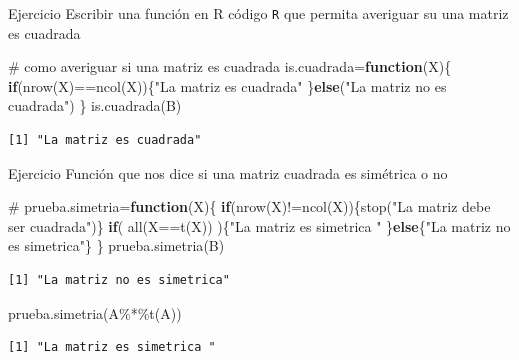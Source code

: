 \documentclass[
  ignorenonframetext,
  aspectratio=169,
  spanish,
]{beamer}
\newenvironment{Shaded}{\begin{snugshade}}{\end{snugshade}}
\newcommand{\CommentTok}[1]{\textcolor[rgb]{0.37,0.37,0.37}{#1}}
\newcommand{\ControlFlowTok}[1]{\textcolor[rgb]{0.00,0.23,0.31}{\textbf{#1}}}
\newcommand{\FunctionTok}[1]{\textcolor[rgb]{0.28,0.35,0.67}{#1}}
\newcommand{\NormalTok}[1]{\textcolor[rgb]{0.00,0.23,0.31}{#1}}
\newcommand{\OtherTok}[1]{\textcolor[rgb]{0.00,0.23,0.31}{#1}}
\newcommand{\SpecialCharTok}[1]{\textcolor[rgb]{0.37,0.37,0.37}{#1}}
\newcommand{\StringTok}[1]{\textcolor[rgb]{0.13,0.47,0.30}{#1}}
\begin{document}
\begin{frame}[fragile]{Ejercicio}
\label{ejercicio-1}
Escribir una función en R código \texttt{R} que permita averiguar su una
matriz es cuadrada

\begin{Shaded}
\begin{Highlighting}[]
\CommentTok{\# como averiguar si una matriz es cuadrada }
\NormalTok{is.cuadrada}\OtherTok{=}\ControlFlowTok{function}\NormalTok{(X)\{}
    \ControlFlowTok{if}\NormalTok{(}\FunctionTok{nrow}\NormalTok{(X)}\SpecialCharTok{==}\FunctionTok{ncol}\NormalTok{(X))\{}\StringTok{"La matriz es cuadrada"}
\NormalTok{    \}}\ControlFlowTok{else}\NormalTok{(}\StringTok{"La matriz no es cuadrada"}\NormalTok{)}
\NormalTok{        \}}
\FunctionTok{is.cuadrada}\NormalTok{(B) }
\end{Highlighting}
\end{Shaded}

\begin{verbatim}
[1] "La matriz es cuadrada"
\end{verbatim}
\end{frame}

\begin{frame}[fragile]{Ejercicio}
\label{ejercicio-2}
Función que nos dice si una matriz cuadrada es simétrica o no

\begin{Shaded}
\begin{Highlighting}[]
\CommentTok{\#  }
\NormalTok{prueba.simetria}\OtherTok{=}\ControlFlowTok{function}\NormalTok{(X)\{}
\ControlFlowTok{if}\NormalTok{(}\FunctionTok{nrow}\NormalTok{(X)}\SpecialCharTok{!=}\FunctionTok{ncol}\NormalTok{(X))\{}\FunctionTok{stop}\NormalTok{(}\StringTok{"La matriz debe ser cuadrada"}\NormalTok{)\}}
\ControlFlowTok{if}\NormalTok{( }\FunctionTok{all}\NormalTok{(X}\SpecialCharTok{==}\FunctionTok{t}\NormalTok{(X)) )\{}\StringTok{"La matriz es simetrica "}
\NormalTok{\}}\ControlFlowTok{else}\NormalTok{\{}\StringTok{"La matriz no es simetrica"}\NormalTok{\}     }
\NormalTok{\}}
\FunctionTok{prueba.simetria}\NormalTok{(B)}
\end{Highlighting}
\end{Shaded}

\begin{verbatim}
[1] "La matriz no es simetrica"
\end{verbatim}

\begin{Shaded}
\begin{Highlighting}[]
\FunctionTok{prueba.simetria}\NormalTok{(A}\SpecialCharTok{\%*\%}\FunctionTok{t}\NormalTok{(A)) }
\end{Highlighting}
\end{Shaded}

\begin{verbatim}
[1] "La matriz es simetrica "
\end{verbatim}
\end{frame}
\end{document}
